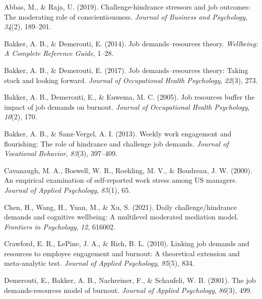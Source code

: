 \documentclass[
  man,mask]{apa7}
\newlength{\cslhangindent}
\newlength{\cslentryspacingunit} %
\newenvironment{CSLReferences}[2] %
 {%
  \setlength{\parindent}{0pt}
  \ifodd #1
  \let\oldpar\par
  \def\par{\hangindent=\cslhangindent\oldpar}
  \fi
  \setlength{\parskip}{#2\cslentryspacingunit}
 }%
 {}
\begin{document}
\hypertarget{refs}{}
\begin{CSLReferences}{1}{0}
\leavevmode{}%
Abbas, M., \& Raja, U. (2019). Challenge-hindrance stressors and job outcomes: The moderating role of conscientiousness. \emph{Journal of Business and Psychology}, \emph{34}(2), 189--201.

\leavevmode{}%
Bakker, A. B., \& Demerouti, E. (2014). Job demands--resources theory. \emph{Wellbeing: A Complete Reference Guide}, 1--28.

\leavevmode{}%
Bakker, A. B., \& Demerouti, E. (2017). Job demands--resources theory: Taking stock and looking forward. \emph{Journal of Occupational Health Psychology}, \emph{22}(3), 273.

\leavevmode{}%
Bakker, A. B., Demerouti, E., \& Euwema, M. C. (2005). Job resources buffer the impact of job demands on burnout. \emph{Journal of Occupational Health Psychology}, \emph{10}(2), 170.

\leavevmode{}%
Bakker, A. B., \& Sanz-Vergel, A. I. (2013). Weekly work engagement and flourishing: The role of hindrance and challenge job demands. \emph{Journal of Vocational Behavior}, \emph{83}(3), 397--409.

\leavevmode{}%
Cavanaugh, M. A., Boswell, W. R., Roehling, M. V., \& Boudreau, J. W. (2000). An empirical examination of self-reported work stress among US managers. \emph{Journal of Applied Psychology}, \emph{85}(1), 65.

\leavevmode{}%
Chen, H., Wang, H., Yuan, M., \& Xu, S. (2021). Daily challenge/hindrance demands and cognitive wellbeing: A multilevel moderated mediation model. \emph{Frontiers in Psychology}, \emph{12}, 616002.

\leavevmode{}%
Crawford, E. R., LePine, J. A., \& Rich, B. L. (2010). Linking job demands and resources to employee engagement and burnout: A theoretical extension and meta-analytic test. \emph{Journal of Applied Psychology}, \emph{95}(5), 834.

\leavevmode{}%
Demerouti, E., Bakker, A. B., Nachreiner, F., \& Schaufeli, W. B. (2001). The job demands-resources model of burnout. \emph{Journal of Applied Psychology}, \emph{86}(3), 499.


\end{CSLReferences}
\end{document}
